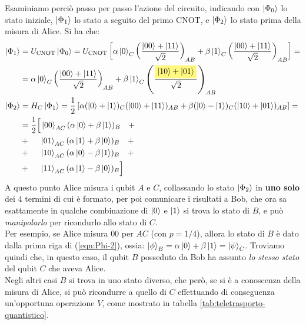 \documentclass[../../InformazioneQuantistica.tex]{subfiles}
\begin{document}
Esaminiamo perciò passo per passo l'azione del circuito, indicando con $\Ket{\Phi_0}$ lo stato iniziale, $\Ket{\Phi_1}$ lo stato a seguito del primo CNOT, e $\Ket{\Phi_2}$ lo stato prima della misura di Alice. Si ha che:
\begin{align} \nonumber
\ket{\Phi_1} &= U_{\op{CNOT}} \ket{\Phi_0} = U_{\op{CNOT}}\left[\alpha\ket{0}_C\left(\frac{\ket{00}+\ket{11}}{\sqrt{2}}\right) _{AB}+ \beta\ket{1}_C \left(\frac{\ket{00}+\ket{11}}{\sqrt{2}}\right)_{AB}\right] =\\ \label{eqn:Phi-1}
&= \alpha\ket{0}_C \left(\frac{\ket{00}+\ket{11}}{\sqrt{2}}\right)_{AB} + \beta\ket{1}_C \left(\frac{\hlc{Yellow}{\ket{10}+\ket{01}}}{\sqrt{2}}\right)_{AB}\\
\nonumber \ket{\Phi_2} &=H_C \ket{\Phi_1} = \frac{1}{2}\left[\alpha (\ket{0} + \ket{1})_C (\ket{00}+\ket{11})_{AB} + \beta(\ket{0}-\ket{1})_{C}(\ket{10}+\ket{01})_{AB}\right] =\\ \nonumber
&=\frac{1}{2}\Big[\ket{00}_{AC} (\alpha\ket{0}+\beta\ket{1})_B \quad+\\ \nonumber
&+\quad\>\,  \ket{01}_{AC}(\alpha\ket{1} + \beta\ket{0})_B \quad+\\ \nonumber
&+\quad\>\,
\ket{10}_{AC} (\alpha\ket{0} - \beta\ket{1})_{B} \quad+\\
&+\quad\>\,
\ket{11}_{AC}(\alpha\ket{1}-\beta\ket{0})_B \Big]
\label{eqn:Phi-2}
\end{align}
A questo punto Alice misura i qubit $A$ e $C$, collassando lo stato $\Ket{\Phi_2}$ in \textbf{uno solo} dei $4$ termini di cui è formato, per poi comunicare i risultati a Bob, che ora sa esattamente in qualche combinazione di $\Ket{0}$ e $\Ket{1}$ si trova lo stato di $B$, e può \textit{manipolarlo} per ricondurlo allo stato di $C$.\\

Per esempio, se Alice misura $00$ per $AC$ (con $p=1/4$), allora lo stato di $B$ è dato dalla prima riga di (\ref{eqn:Phi-2}), ossia: $\Ket{\phi}_B = \alpha\Ket{0}+\beta\Ket{1}=\Ket{\psi}_C$. Troviamo quindi che, in questo caso, il qubit $B$ posseduto da Bob ha assunto \textit{lo stesso stato} del qubit $C$ che aveva Alice.\\

Negli altri casi $B$ si trova in uno stato diverso, che però, se si è a conoscenza della misura di Alice, si può ricondurre a quello di $C$ effettuando di conseguenza un'opportuna operazione $V$, come mostrato in tabella \ref{tab:teletrasporto-quantistico}.
\end{document}
